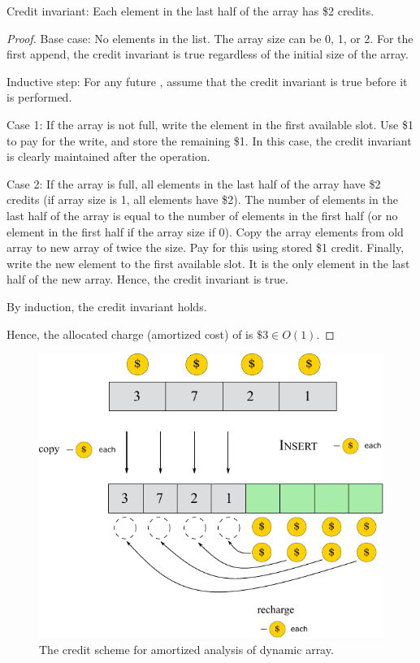 Credit invariant: Each element in the last half of the array has \$2 credits.

\begin{proof}
    Base case: No elements in the list. The array size can be 0, 1, or 2. For the first append, the credit invariant is true regardless of the initial size of the array.

    Inductive step: For any future , assume that the credit invariant is true before it is performed.

    Case 1: If the array is not full, write the element in the first available slot. Use \$1 to pay for the write, and store the remaining \$1. In this case, the credit invariant is clearly maintained after the  operation.

    Case 2: If the array is full, all elements in the last half of the array have \$2 credits (if array size is 1, all elements have \$2). The number of elements in the last half of the array is equal to the number of elements in the first half (or no element in the first half if the array size if 0). Copy the array elements from old array to new array of twice the size. Pay for this using stored \$1 credit. Finally, write the new element to the first available slot. It is the only element in the last half of the new array. Hence, the credit invariant is true.

    By induction, the credit invariant holds.

    Hence, the allocated charge (amortized cost) of  is $\$3 \in O(1)$.
\end{proof}

\begin{figure}[htbp]
    \centering
    \includegraphics[width=0.6\linewidth]{figures/accounting_method_insert.pdf}
    \caption{The credit scheme for amortized analysis of dynamic array.}
    \label{fig:dyarr-amortized}
\end{figure}

